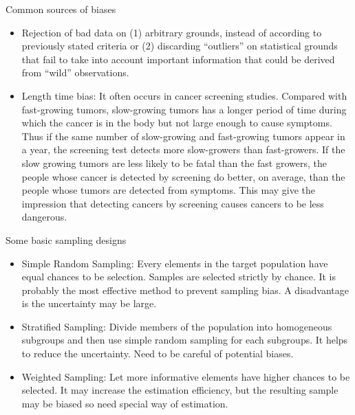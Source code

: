 \documentclass[serif,envcountsect,table,t]{beamer}%
\begin{document}
\begin{frame}{Common sources of biases}
\begin{itemize}
\item Rejection of bad data on (1) arbitrary grounds, instead of according to previously stated criteria or (2) discarding ``outliers'' on statistical grounds that fail to take into account important information that could be derived from ``wild'' observations.
\item Length time bias: It often occurs in cancer screening studies. Compared with fast-growing tumors, slow-growing tumors has a longer period of time during which the cancer is in the body but not large enough to cause symptoms. Thus if the same number of slow-growing and fast-growing tumors appear in a year, the screening test detects more slow-growers than fast-growers. If the slow growing tumors are less likely to be fatal than the fast growers, the people whose cancer is detected by screening do better, on average, than the people whose tumors are detected from symptoms. This may give the impression that detecting cancers by screening causes cancers to be less dangerous.  %
\end{itemize}
\end{frame}
\begin{frame}{Some basic sampling designs}
  \begin{itemize}
  \item Simple Random Sampling: Every elements in the target population have equal chances to be selection. Samples are selected strictly by chance. It is probably the most effective method to prevent sampling bias. A disadvantage is the uncertainty may be large.
  \item Stratified Sampling: Divide members of the population into homogeneous subgroups and then use simple random sampling for each subgroups. It helps to reduce the uncertainty. Need to be careful of potential biases.
  \item Weighted Sampling: Let more informative elements have higher chances to be selected. It may increase the estimation efficiency, but the resulting sample may be biased so need special way of estimation.
  \end{itemize}
\end{frame}
\end{document}
